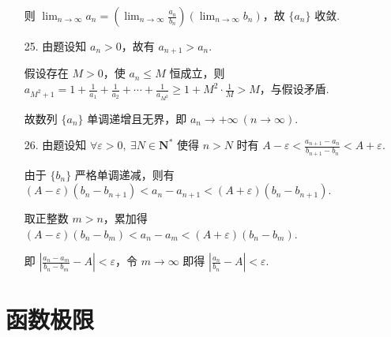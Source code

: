 \documentclass[oneside]{ctexbook} %
\begin{document}
\begin{enumerate}
    则 $\displaystyle\lim_{n \to \infty} a_n = \left( \lim_{n \to \infty} \frac{a_n}{b_n} \right) \left(\lim_{n \to \infty} b_n \right)$，故 $\{ a_n \}$ 收敛.
    \item[25.]
    由题设知 $a_n>0$，故有 $a_{n+1}>a_n$.
    
    假设存在 $M>0$，使 $a_n \leqslant M$ 恒成立，则 $a_{M^2+1} = 1 + \frac 1 {a_1} + \frac 1 {a_2} + \cdots + \frac 1 {a_{M^2}} \ge 1 + M^2 \cdot \frac 1 M > M$，与假设矛盾.
    
    故数列 $\{ a_n \}$ 单调递增且无界，即 $ a_n \to +\infty \ (n \to \infty)$.
    \item[26.]
    由题设知 $\forall \varepsilon>0,\ \exists N \in \mathbf{N^*}$ 使得 $n>N$ 时有 $A-\varepsilon < \frac{a_{n+1}-a_n}{b_{n+1}-b_n} < A+\varepsilon$.
    
    由于 $\{ b_n \}$ 严格单调递减，则有 $(A-\varepsilon)(b_n-b_{n+1}) < a_n - a_{n+1} < (A+\varepsilon)(b_n-b_{n+1})$.
    
    取正整数 $m>n$，累加得 $(A-\varepsilon)(b_n-b_m) < a_n - a_m < (A+\varepsilon)(b_n-b_m)$.
    
    即 $\left| \frac{a_n-a_m}{b_n-b_m} - A \right| < \varepsilon$，令 $m \to \infty$ 即得 $\left| \frac{a_n}{b_n} - A \right| < \varepsilon$.
\end{enumerate}

\section{函数极限}
\end{document}
